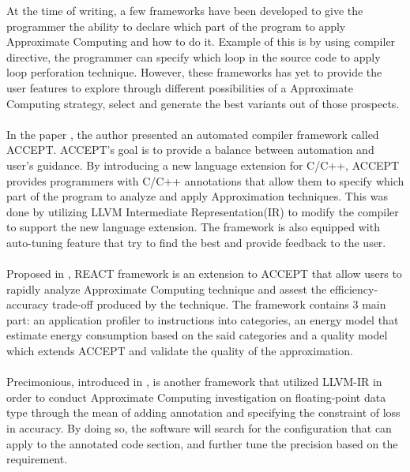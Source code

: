 At the time of writing, a few frameworks have been developed to give the programmer the ability to declare which part of the program to apply Approximate Computing and how to do it. Example of this is by using compiler directive, the programmer can specify which loop in the source code to apply loop perforation technique. However, these frameworks has yet to provide the user features to explore through different possibilities of a Approximate Computing strategy, select and generate the best variants out of those prospects. \\
~\\
In the paper \cite{accept}, the author presented an automated compiler framework called ACCEPT. ACCEPT's goal is to provide a balance between automation and user's guidance. By introducing a new language extension for C/C++, ACCEPT provides programmers with C/C++ annotations that allow them to specify which part of the program to analyze and apply Approximation techniques. This was done by utilizing LLVM Intermediate Representation(IR) to modify the compiler to support the new language extension. The framework is also equipped with auto-tuning feature that try to find the best and provide feedback to the user. \\
~\\
Proposed in \cite{react}, REACT framework is an extension to ACCEPT that allow users to rapidly analyze Approximate Computing technique and assest the efficiency-accuracy trade-off produced by the technique. The framework contains 3 main part: an application profiler to instructions into categories, an energy model that estimate energy consumption based on the said categories and a quality model which extends ACCEPT and validate the quality of the approximation. \\
~\\
Precimonious, introduced in \cite{Precimonious}, is another framework that utilized LLVM-IR in order to conduct Approximate Computing investigation on floating-point data type through the mean of adding annotation and specifying the constraint of loss in accuracy. By doing so, the software will search for the configuration that can apply to the annotated code section, and further tune the precision based on the requirement. \\